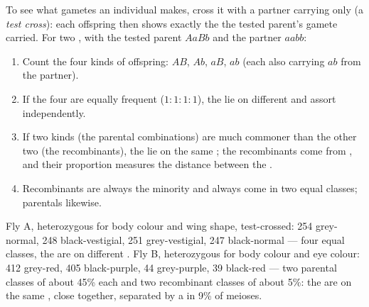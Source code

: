 \begin{method}\label{met:g12:meiosis-genetic-shuffling:testcross}
To see what gametes an individual makes, cross it with a partner
carrying only   (a \emph{test cross}): each offspring
then shows exactly the  the tested parent's gamete carried.
For two , with the tested parent $AaBb$ and the partner $aabb$:
\begin{enumerate}
  \item Count the four kinds of offspring: $AB$, $Ab$, $aB$, $ab$
        (each also carrying $ab$ from the partner).
  \item If the four are equally frequent ($1:1:1:1$), the  lie on
        different  and assort independently.
  \item If two kinds (the parental combinations) are much commoner than
        the other two (the recombinants), the  lie on the same
        ; the recombinants come from , and
        their proportion measures the distance between the .
  \item Recombinants are always the minority and always come in two
        equal classes; parentals likewise.
\end{enumerate}
\end{method}

\begin{example}\label{ex:g12:meiosis-genetic-shuffling:fly}
Fly A, heterozygous for body colour and wing shape, test-crossed: 254
grey-normal, 248 black-vestigial, 251 grey-vestigial, 247
black-normal --- four equal classes, the  are on different
. Fly B, heterozygous for body colour and eye colour:
412 grey-red, 405 black-purple, 44 grey-purple, 39 black-red --- two
parental classes of about 45\% each and two recombinant classes of
about 5\%: the  are on the same , close together,
separated by a  in 9\% of meioses.
\end{example}

